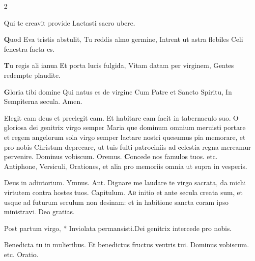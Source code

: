 \begin{multicols*}{2}
{Qui te creavit provide
Lactasti sacro ubere.
\par {\bfseries \color{Red} Q}uod Eva tristis abstulit,
Tu reddis almo germine,
Intrent ut astra flebiles
Celi fenestra facta es.
\par {\bfseries \color{Blue} T}u regis ali ianua
Et porta lucis fulgida,
Vitam datam per virginem,
Gentes redempte plaudite.
\par {\bfseries \color{Red} G}loria tibi domine
Qui natus es de virgine
Cum Patre et Sancto Spiritu,
In Sempiterna secula. Amen.
}
\newline \V Elegit eam deus et preelegit eam.
\newline \R Et habitare eam facit in tabernaculo suo.
 O gloriosa dei genitrix virgo semper Maria que dominum omnium meruisti portare et regem angelorum sola virgo semper lactare nostri quesumus pia memorare, et pro nobis Christum deprecare, ut tuis fulti patrociniis ad celestia regna mereamur pervenire. Dominus vobiscum. Oremus.
{\bfseries \color{Red} C}{oncede} nos famulos tuos. etc.
{\color{Red} Antiphone, Versiculi, Orationes, et alia pro memoriis omnia ut supra in vesperis.}
{\color{Red} }
\par \noindent Deus in adiutorium. {\color{Red} Ymnus.}
{\color{Red} Ant.} Dignare me laudare te virgo sacrata, da michi virtutem contra hostes tuos. {\color{Red} Capitulum.}
\lettrine[lines=2]{\zallmancaps \color{Blue} A}{b} initio et ante secula creata sum, et usque ad futurum seculum non desinam: et in habitione sancta coram ipso ministravi. Deo gratias.
\begin{responsory-breve}
{Post partum virgo, * Inviolata permansisti.}{Dei genitrix intercede pro nobis.}
\end{responsory-breve}%
\V Benedicta tu in mulieribus. \R Et benedictus fructus ventris tui. Dominus vobiscum. etc. {\color{Red} Oratio.}

\end{multicols*}
